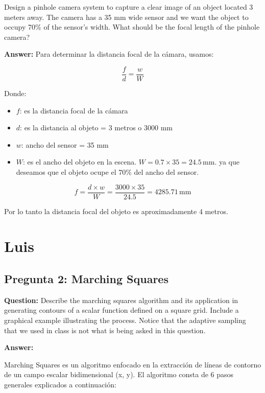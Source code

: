 \documentclass{article}
\begin{document}
Design a pinhole camera system to capture a clear image of an object located 3 meters away. The camera has a 35 mm wide sensor and we want the object to occupy 70\% of the sensor's width. What should be the focal length of the pinhole camera?

\textbf{Answer:}
Para determinar la distancia focal de la cámara, usamos:

\[
\frac{f}{d} = \frac{w}{W}
\]

Donde:

\begin{itemize}
    \item $f$: es la distancia focal de la cámara
    \item $d$: es la distancia al objeto = 3 metros o 3000 mm
    \item $w$: ancho del sensor = 35 mm
    \item $W$: es el ancho del objeto en la escena. \(W = 0.7 \times 35 = 24.5 \, \text{mm}\). ya que deseamos que el objeto ocupe el 70\% del ancho del sensor.
\end{itemize}

\[
f = \frac{d \times w}{W} = \frac{3000 \times 35}{24.5} = 4285.71 \, \text{mm}
\]

Por lo tanto la distancia focal del objeto es aproximadamente 4 metros.

\section{Luis}

\subsection{Pregunta 2: Marching Squares}

\textbf{Question:} Describe the marching squares algorithm and its application in generating contours of a scalar function defined on a square grid. Include a graphical example illustrating the process. Notice that the adaptive sampling that we used in class is not what is being asked in this question.

\textbf{Answer:}

Marching Squares es un algoritmo enfocado en la extracción de líneas de contorno de un campo escalar bidimensional (x, y). El algoritmo consta de 6 pasos generales explicados a continuación:
\end{document}
